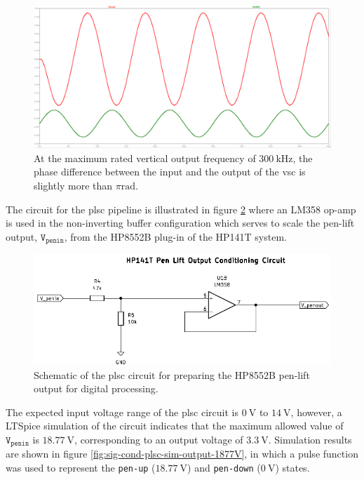 \documentclass[class=report,11pt,crop=false]{standalone}
\begin{document}
	\begin{figure}[h!]
		\centering
		\includegraphics[width=0.7\linewidth]{Figures/Methodology/sig-cond-vsc-sine-sim-output-100khz}
		\caption{At the maximum rated vertical output frequency of $\SI{300}{\kilo\hertz}$, the phase difference between the input and the output of the \acrshort{vsc} is slightly more than $\pi\si{\radian}$.}
		\label{fig:sig-cond-vsc-sine-sim-output-300khz}
	\end{figure}  
	
	The circuit for the \acrlong{plsc} pipeline is illustrated in figure \ref{fig:sig-cond-plsc-schematic} where an LM358 op-amp is used in the non-inverting buffer configuration which serves to scale the pen-lift output, $\texttt{V}_\texttt{penin}$, from the HP8552B plug-in of the HP141T system. 
	
	\begin{figure}[h!]
		\centering
		\includegraphics[width=0.7\linewidth]{Figures/Methodology/sig-cond-plsc-schematic}
		\caption{Schematic of the \acrshort{plsc} circuit for preparing the HP8552B pen-lift output for digital processing.}
		\label{fig:sig-cond-plsc-schematic}
	\end{figure}  
	
	The expected input voltage range of the \acrshort{plsc} circuit is $\SI{0}{\volt}$ to $\SI{14}{\volt}$, however, a LTSpice simulation of the circuit indicates that the maximum allowed value of $\texttt{V}_\texttt{penin}$ is $\SI{18.77}{\volt}$, corresponding to an output voltage of $\SI{3.3}{\volt}$. Simulation results are shown in figure \ref{fig:sig-cond-plsc-sim-output-1877V}, in which a pulse function was used to represent the \texttt{pen-up} ($\SI{18.77}{\volt}$) and \texttt{pen-down} ($\SI{0}{\volt}$) states. 
	
\end{document}
